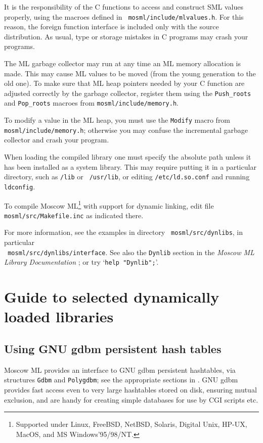 \documentclass[fleqn,a4paper]{article}
\begin{document}
It is the responsibility of the C functions to access and construct
SML values properly, using the macroes defined in {\tt
  mosml/include/mlvalues.h}.  For this reason, the foreign
function interface is included only with the source distribution.  As
usual, type or storage mistakes in C programs may crash your programs.

The ML garbage collector may run at any time an ML memory allocation
is made.  This may cause ML values to be moved (from the young
generation to the old one).  To make sure that ML heap pointers needed
by your C function are adjusted correctly by the garbage collector,
register them using the \verb+Push_roots+ and \verb+Pop_roots+ macroes
from {\tt mosml/include/memory.h}.

To modify a value in the ML heap, you must use the {\tt Modify} macro
from {\tt mosml/include/memory.h}; otherwise you may confuse the incremental
garbage collector and crash your program.

When loading the compiled library one must specify the absolute path
unless it has been installed as a system library.  This may require
putting it in a particular directory, such as {\tt /lib} or {\tt
  /usr/lib}, or editing {\tt /etc/ld.so.conf} and running {\tt
  ldconfig}.

To compile Moscow ML\footnote{Supported under Linux, FreeBSD, NetBSD,
  Solaris, Digital Unix, HP-UX, MacOS, and MS Windows'95/98/NT.} with
support for dynamic linking, edit file {\tt mosml/src/Makefile.inc} as
indicated there.

For more information, see the examples in directory {\tt
  mosml/src/dynlibs}, in particular\\ {\tt
  mosml/src/dynlibs/interface}\@.  See also the {\tt Dynlib} section
in the \emph{Moscow ML Library Documentation}
\cite{MoscowML:2000:MoscowMLLibrary}; or try `{\tt help "Dynlib";}'.


\newpage \section{Guide to selected dynamically loaded libraries}

\subsection{Using GNU gdbm persistent hash tables }
\label{sec-using-mgdbm}

Moscow ML provides an interface to GNU gdbm persistent hashtables, via
structures {\tt Gdbm} and {\tt Polygdbm}; see the appropriate sections
in \cite{MoscowML:2000:MoscowMLLibrary}.  GNU gdbm provides fast
access even to very large hashtables stored on disk, ensuring mutual
exclusion, and are handy for creating simple databases for use by CGI
scripts etc.
\end{document}
